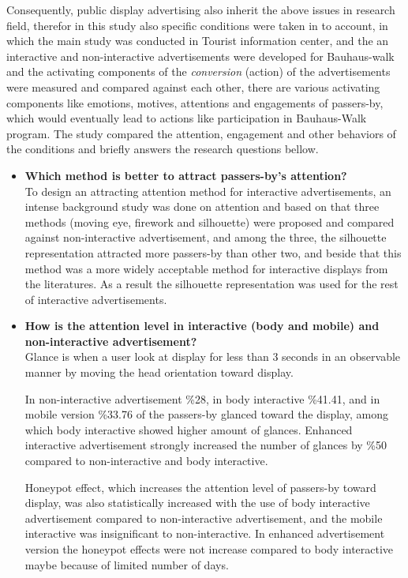 Consequently, public display advertising also inherit the above issues in research field, therefor in this study also specific conditions were taken in to account, in which the main study was conducted in Tourist information center, and the an interactive and non-interactive advertisements were developed for Bauhaus-walk and the activating components of the \emph{conversion} (action) of the advertisements were measured and compared against each other, there are various activating components like emotions, motives, attentions and engagements of passers-by, which would eventually lead to actions like participation in Bauhaus-Walk program. The study compared the attention, engagement and other behaviors of the conditions and briefly answers the research questions bellow.




\begin{itemize}

\item \textbf{Which method is better to attract passers-by's attention?} \\
To design an attracting attention method for interactive advertisements, an intense background study was done on attention and based on that three methods (moving eye, firework and silhouette) were proposed and compared against non-interactive advertisement, and among the three, the silhouette representation attracted more passers-by than other two, and beside that this method was a more widely acceptable method for interactive displays from the literatures. As a result the silhouette representation was used for the rest of interactive advertisements.


\item \textbf{How is the attention level in interactive (body and mobile) and non-interactive advertisement?} \\
Glance is when a user look at display for less than 3 seconds in an observable manner by moving the head orientation toward display. 

In non-interactive advertisement \%28, in body interactive \%41.41, and in mobile version \%33.76 of the passers-by glanced toward the display, among which body interactive showed higher amount of glances. Enhanced interactive advertisement strongly increased the number of glances by \%50 compared to non-interactive and body interactive.

\iffalse
Honeypot effect, which increases the attention level of passers-by toward display, was also statistically increased with the use of body interactive advertisement compared to non-interactive advertisement, and the mobile interactive was insignificant to non-interactive. In enhanced advertisement version the honeypot effects were not increase compared to body interactive maybe because of limited number of days.


\end{itemize}
